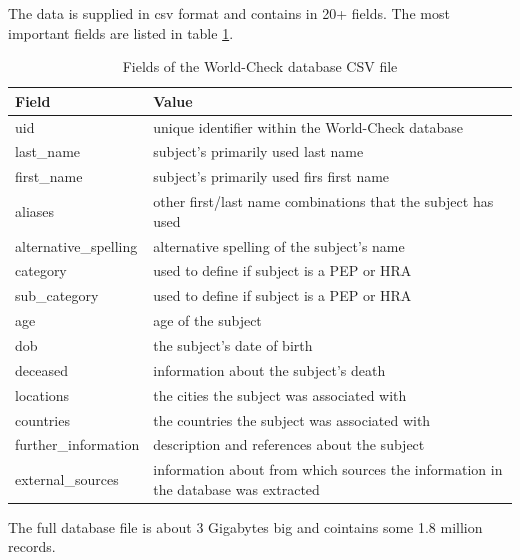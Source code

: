 \documentclass[a4paper, oneside]{csthesis}
\begin{document}
The data is supplied in csv format and contains in 20+ fields. The most important fields are listed in table \ref{tbl:world-check-fields}.

\begin{table}
    \begin{tabular}{l|p{9cm}}
    \hline Field & Value \\ \hline
    uid & unique identifier within the World-Check database\\ \hdashline[0.5pt/3pt]
    last\_name & subject's primarily used last name\\ \hdashline[0.5pt/3pt]
    first\_name & subject's primarily used firs first name \\ \hdashline[0.5pt/3pt]
    aliases & other first/last name combinations that the subject has used\\ \hdashline[0.5pt/3pt]
    alternative\_spelling & alternative spelling of the subject's name\\ \hdashline[0.5pt/3pt]
    category & used to define if subject is a PEP or HRA\\ \hdashline[0.5pt/3pt]
    sub\_category & used to define if subject is a PEP or HRA\\ \hdashline[0.5pt/3pt]
    age & age of the subject \\ \hdashline[0.5pt/3pt]
    dob & the subject's date of birth \\ \hdashline[0.5pt/3pt]
    deceased & information about the subject's death \\ \hdashline[0.5pt/3pt]
    locations & the cities the subject was associated with \\ \hdashline[0.5pt/3pt]
    countries & the countries the subject was associated with \\ \hdashline[0.5pt/3pt]
    further\_information & description and references about the subject \\ \hdashline[0.5pt/3pt]
    external\_sources & information about from which sources the information in the database was extracted \\ \hline

    \end{tabular}

    \caption{Fields of the World-Check database CSV file}
    \label{tbl:world-check-fields}
\end{table}


The full database file is about 3 Gigabytes big and cointains some 1.8 million records.
\end{document}
